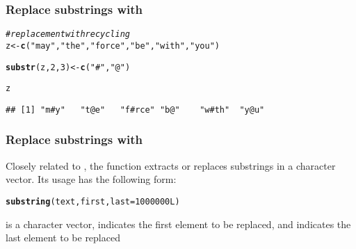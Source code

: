\documentclass[12pt]{beamer}\usepackage[]{graphicx}\usepackage[]{color}
\makeatletter
\newcommand{\hlnum}[1]{\textcolor[rgb]{0.686,0.059,0.569}{#1}}%
\newcommand{\hlstr}[1]{\textcolor[rgb]{0.192,0.494,0.8}{#1}}%
\newcommand{\hlcom}[1]{\textcolor[rgb]{0.678,0.584,0.686}{\textit{#1}}}%
\newcommand{\hlstd}[1]{\textcolor[rgb]{0.345,0.345,0.345}{#1}}%
\newcommand{\hlkwb}[1]{\textcolor[rgb]{0.69,0.353,0.396}{#1}}%
\newcommand{\hlkwc}[1]{\textcolor[rgb]{0.333,0.667,0.333}{#1}}%
\newcommand{\hlkwd}[1]{\textcolor[rgb]{0.737,0.353,0.396}{\textbf{#1}}}%
\newenvironment{kframe}{%
 \def\at@end@of@kframe{}%
 \ifinner\ifhmode%
  \def\at@end@of@kframe{\end{minipage}}%
  \begin{minipage}{\columnwidth}%
 \fi\fi%
 \def\FrameCommand##1{\hskip\@totalleftmargin \hskip-\fboxsep
 \colorbox{shadecolor}{##1}\hskip-\fboxsep
     \hskip-\linewidth \hskip-\@totalleftmargin \hskip\columnwidth}%
 \MakeFramed {\advance\hsize-\width
   \@totalleftmargin\z@ \linewidth\hsize
   \@setminipage}}%
 {\par\unskip\endMakeFramed%
 \at@end@of@kframe}
\newenvironment{knitrout}{}{} %
\makeatother
\begin{document}

\begin{frame}[fragile]
\frametitle{Replace substrings with }

\begin{knitrout}\footnotesize
{}\color{fgcolor}\begin{kframe}
\begin{alltt}
\hlcom{# replacement with recycling}
\hlstd{z} \hlkwb{<-} \hlkwd{c}\hlstd{(}\hlstr{"may"}\hlstd{,} \hlstr{"the"}\hlstd{,} \hlstr{"force"}\hlstd{,} \hlstr{"be"}\hlstd{,} \hlstr{"with"}\hlstd{,} \hlstr{"you"}\hlstd{)}

\hlkwd{substr}\hlstd{(z,} \hlnum{2}\hlstd{,} \hlnum{3}\hlstd{)} \hlkwb{<-} \hlkwd{c}\hlstd{(}\hlstr{"#"}\hlstd{,} \hlstr{"@"}\hlstd{)}

\hlstd{z}
\end{alltt}
\begin{verbatim}
## [1] "m#y"   "t@e"   "f#rce" "b@"    "w#th"  "y@u"
\end{verbatim}
\end{kframe}
\end{knitrout}

\end{frame}


\begin{frame}[fragile]
\frametitle{Replace substrings with }

Closely related to , the function {\hilit {}} extracts or replaces substrings in a character vector. Its usage has the following form:
\begin{knitrout}\footnotesize
{}\color{fgcolor}\begin{kframe}
\begin{alltt}
\hlkwd{substring}\hlstd{(text, first,} \hlkwc{last} \hlstd{=} \hlnum{1000000L}\hlstd{)}
\end{alltt}
\end{kframe}
\end{knitrout}

 is a character vector,  indicates the first element to be replaced, and  indicates the last element to be replaced

\end{frame}
\end{document}
